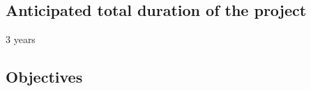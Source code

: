 \documentclass[enabledeprecatedfontcommands,cleardoublepage=empty,headsepline,twoside,11pt,DIV=15,BCOR=12mm,final]{scrartcl}
\newcommand{\newf}[1]{}%
\begin{document}
%


\subsection{Anticipated total duration of the project}
\label{sec:duration}

3 years

\subsection{Objectives}\label{sec:Objectives}
\end{document}
